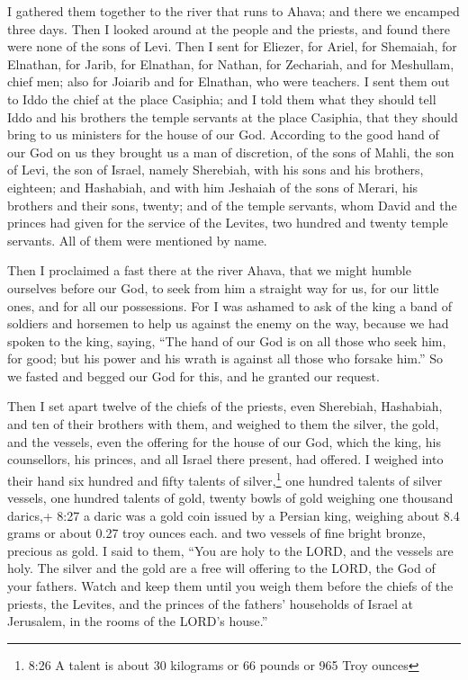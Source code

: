  I gathered them together to the river that runs to Ahava;
and there we encamped three days. Then I looked around at the people and
the priests, and found there were none of the sons of Levi.
 Then I sent for Eliezer, for Ariel, for Shemaiah, for
Elnathan, for Jarib, for Elnathan, for Nathan, for Zechariah, and for
Meshullam, chief men; also for Joiarib and for Elnathan, who were
teachers.  I sent them out to Iddo the chief at the place
Casiphia; and I told them what they should tell Iddo and his brothers
the temple servants at the place Casiphia, that they should bring to us
ministers for the house of our God.  According to the good
hand of our God on us they brought us a man of discretion, of the sons
of Mahli, the son of Levi, the son of Israel, namely Sherebiah, with his
sons and his brothers, eighteen;  and Hashabiah, and with
him Jeshaiah of the sons of Merari, his brothers and their sons, twenty;
 and of the temple servants, whom David and the princes had
given for the service of the Levites, two hundred and twenty temple
servants. All of them were mentioned by name.

 Then I proclaimed a fast there at the river Ahava, that we
might humble ourselves before our God, to seek from him a straight way
for us, for our little ones, and for all our possessions. 
For I was ashamed to ask of the king a band of soldiers and horsemen to
help us against the enemy on the way, because we had spoken to the king,
saying, ``The hand of our God is on all those who seek him, for good;
but his power and his wrath is against all those who forsake him.''
 So we fasted and begged our God for this, and he granted
our request.

 Then I set apart twelve of the chiefs of the priests, even
Sherebiah, Hashabiah, and ten of their brothers with them, 
and weighed to them the silver, the gold, and the vessels, even the
offering for the house of our God, which the king, his counsellors, his
princes, and all Israel there present, had offered.  I
weighed into their hand six hundred and fifty talents of
silver,\footnote{8:26 A talent is about 30 kilograms or 66 pounds or 965
  Troy ounces} one hundred talents of silver vessels, one hundred
talents of gold,  twenty bowls of gold weighing one
thousand darics,+ 8:27 a daric was a gold coin issued by a Persian king,
weighing about 8.4 grams or about 0.27 troy ounces each. and two vessels
of fine bright bronze, precious as gold.  I said to them,
``You are holy to the LORD, and the vessels are holy. The silver and the
gold are a free will offering to the LORD, the God of your fathers.
 Watch and keep them until you weigh them before the chiefs
of the priests, the Levites, and the princes of the fathers' households
of Israel at Jerusalem, in the rooms of the LORD's house.''

